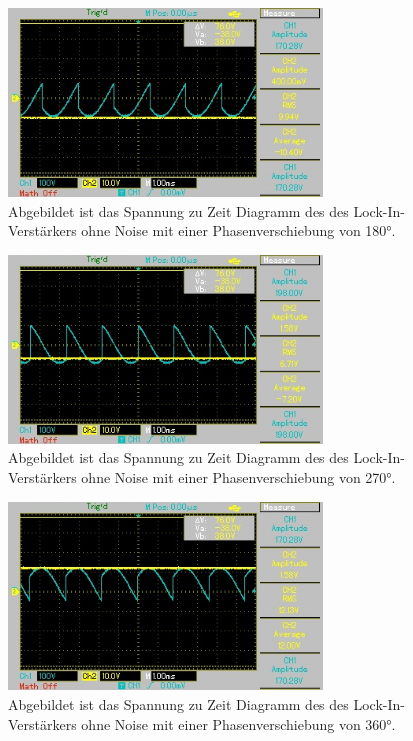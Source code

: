 \begin{figure}[H]
  \centering
  \includegraphics[height=5cm]{Bilder/phi180.jpg}
  \caption{Abgebildet ist das Spannung zu Zeit Diagramm des des Lock-In-Verstärkers ohne Noise mit einer Phasenverschiebung von 180°.}
  \label{fig:phi180}
\end{figure}

\begin{figure}[H]
  \centering
  \includegraphics[height=5cm]{Bilder/phi270.jpg}
  \caption{Abgebildet ist das Spannung zu Zeit Diagramm des des Lock-In-Verstärkers ohne Noise mit einer Phasenverschiebung von 270°.}
  \label{fig:phi270}
\end{figure}

\begin{figure}[H]
  \centering
  \includegraphics[height=5cm]{Bilder/phi360.jpg}
  \caption{Abgebildet ist das Spannung zu Zeit Diagramm des des Lock-In-Verstärkers ohne Noise mit einer Phasenverschiebung von 360°.}
  \label{fig:phi360}
\end{figure}

